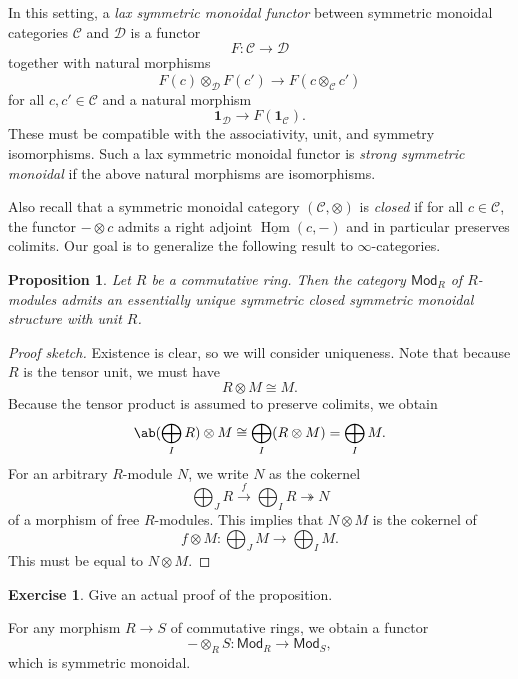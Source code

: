 \documentclass[10pt, oneside]{memoir}
\newtheorem{prop}[thm]{Proposition}
\theoremstyle{definition}
\newtheorem{exer}[thm]{Exercise}
\theoremstyle{remark}
\theoremstyle{plain}
\theoremstyle{definition}
\theoremstyle{remark}
\newcommand{\mc}[1]{\mathcal{#1}}
\newcommand{\ms}[1]{\mathsf{#1}}
\newcommand{\ul}[1]{\underline{#1}}
\newcommand{\1}{\mathbf{1}}
\newcommand{\2}{\mathbf{2}}
\newcommand{\3}{\mathbf{3}}
\DeclareMathOperator{\Hom}{Hom}
\begin{document}
In this setting, a \textit{lax symmetric monoidal functor} between symmetric monoidal categories \(\mc{C} \) and \(\mc{D} \) is a functor 
\[ F \colon \mc{C} \to \mc{D} \]
together with natural morphisms
\[ F(c) \otimes_{\mc{D}} F(c') \to F(c \otimes_{\mc{C}} c') \]
for all \(c, c' \in \mc{C} \) and a natural morphism
\[ \1_{\mc{D}} \to F(\1_{\mc{C}}). \]
These must be compatible with the associativity, unit, and symmetry isomorphisms. Such a lax symmetric monoidal functor is \textit{strong symmetric monoidal} if the above natural morphisms are isomorphisms.

Also recall that a symmetric monoidal category \((\mc{C}, \otimes) \) is \textit{closed} if for all \(c\in \mc{C} \), the functor \(- \otimes c \) admits a right adjoint \(\ul{\Hom}(c, -) \) and in particular preserves colimits. Our goal is to generalize the following result to \(\infty \)-categories.

\begin{prop}
    Let \(R \) be a commutative ring. Then the category \(\ms{Mod}_R \) of \(R \)-modules admits an essentially unique symmetric closed symmetric monoidal structure with unit \(R \).
\end{prop}

\begin{proof}[Proof sketch]
    Existence is clear, so we will consider uniqueness. Note that because \(R \) is the tensor unit, we must have
    \[ R \otimes M \cong M. \]
    Because the tensor product is assumed to preserve colimits, we obtain
    \[ \ab(\bigoplus_I R) \otimes M \cong \bigoplus_I (R \otimes M) = \bigoplus_I M. \]
    For an arbitrary \(R \)-module \(N \), we write \(N \) as the cokernel 
    \[ \bigoplus_J R \xrightarrow{f} \bigoplus_I R \twoheadrightarrow N \]
    of a morphism of free \(R \)-modules. This implies that \(N \otimes M \) is the cokernel of
    \[ f \otimes M \colon \bigoplus_J M \to \bigoplus_I M. \]
    This must be equal to \(N \otimes M \).
\end{proof}

\begin{exer}
    Give an actual proof of the proposition.
\end{exer}

For any morphism \(R \to S \) of commutative rings, we obtain a functor
\[ - \otimes_R S \colon \ms{Mod}_R \to \ms{Mod}_S, \]
which is symmetric monoidal.
\end{document}
